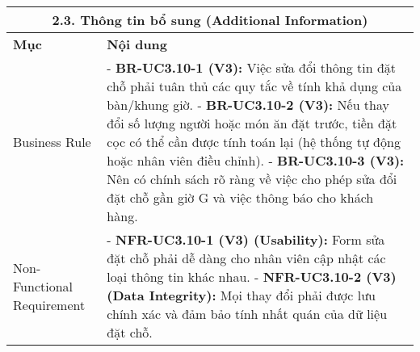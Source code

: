 \begin{longtable}{|m{4cm}|p{11cm}|}
\hline
\multicolumn{2}{|c|}{\textbf{2.3. Thông tin bổ sung (Additional Information)}} \\
\hline
\textbf{Mục} & \textbf{Nội dung} \\
\hline
Business Rule & - \textbf{BR-UC3.10-1 (V3):} Việc sửa đổi thông tin đặt chỗ phải tuân thủ các quy tắc về tính khả dụng của bàn/khung giờ. \newline - \textbf{BR-UC3.10-2 (V3):} Nếu thay đổi số lượng người hoặc món ăn đặt trước, tiền đặt cọc có thể cần được tính toán lại (hệ thống tự động hoặc nhân viên điều chỉnh). \newline - \textbf{BR-UC3.10-3 (V3):} Nên có chính sách rõ ràng về việc cho phép sửa đổi đặt chỗ gần giờ G và việc thông báo cho khách hàng. \\
\hline
Non-Functional Requirement & - \textbf{NFR-UC3.10-1 (V3) (Usability):} Form sửa đặt chỗ phải dễ dàng cho nhân viên cập nhật các loại thông tin khác nhau. \newline - \textbf{NFR-UC3.10-2 (V3) (Data Integrity):} Mọi thay đổi phải được lưu chính xác và đảm bảo tính nhất quán của dữ liệu đặt chỗ. \\
\hline
\end{longtable}

